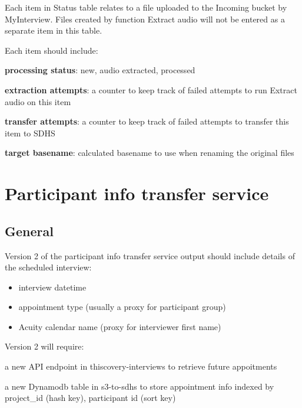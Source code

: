 \documentclass{article}
\renewcommand{\emph}[1]{\textbf{#1}}
\begin{document}
Each item in Status table relates to a file uploaded to the Incoming bucket by MyInterview. Files created by function Extract audio will not be entered as a separate item in this table.

Each item should include:
\begin{compactenum}
\item \emph{processing status}: new, audio extracted, processed
\item \emph{extraction attempts}: a counter to keep track of failed attempts to run Extract audio on this item
\item \emph{transfer attempts}: a counter to keep track of failed attempts to transfer this item to SDHS
\item \emph{target basename}: calculated basename to use when renaming the original files
\end{compactenum}

\section{Participant info transfer service}

\subsection{General}
Version 2 of the participant info transfer service output should include details of the scheduled interview:
\begin{itemize}
 \item interview datetime
 \item appointment type (usually a proxy for participant group)
 \item Acuity calendar name (proxy for interviewer first name)
\end{itemize}

Version 2 will require:
\begin{compactenum}
 \item a new API endpoint in thiscovery-interviews to retrieve future appoitments
 \item a new Dynamodb table in s3-to-sdhs to store appointment info indexed by project\_id (hash key), participant id (sort key)
\end{compactenum}
\end{document}

